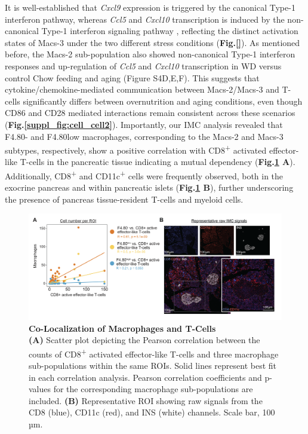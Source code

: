 It is well-established that \textit{Cxcl9} expression is triggered by the canonical Type-1 interferon pathway, whereas \textit{Ccl5} and \textit{Cxcl10} transcription is induced by the non-canonical Type-1 interferon signaling pathway \textbf{\cite{REF}}, reflecting the distinct activation states of Macs-3 under the two different stress conditions (\textbf{Fig.\ref{}}). As mentioned before, the Macs-2 sub-population also showed non-canonical Type-1 interferon responses and up-regulation of \textit{Ccl5} and \textit{Cxcl10} transcription in WD versus control Chow feeding and aging (Figure S4D,E,F). This suggests that cytokine/chemokine-mediated communication between Macs-2/Macs-3 and T-cells significantly differs between overnutrition and aging conditions, even though CD86 and CD28 mediated interactions remain consistent across these scenarios (\textbf{Fig.\ref{suppl_fig:cell_cell2}}). Importantly, our IMC analysis revealed that F4.80- and F4.80low macrophages, corresponding to the Macs-2 and Macs-3 subtypes, respectively, show a positive correlation with CD8\textsuperscript{+} activated effector-like T-cells in the pancreatic tissue indicating a mutual dependency (\textbf{Fig.\ref{fig2-8} A}). Additionally, CD8\textsuperscript{+} and CD11c\textsuperscript{+} cells were frequently observed, both in the exocrine pancreas and within pancreatic islets (\textbf{Fig.\ref{fig2-8} B}), further underscoring the presence of pancreas tissue-resident T-cells and myeloid cells.  


\begin{figure}[H]
\centering
\includegraphics[width=\linewidth]{Chapter4/Fig/F2-8-01.png}
\caption[res-cci-imc]{\textbf{Co-Localization of Macrophages and T-Cells}\\
\textbf{(A)} Scatter plot depicting the Pearson correlation between the counts of CD8\textsuperscript{+} activated effector-like T-cells and three macrophage sub-populations within the same ROIs. Solid lines represent best fit in each correlation analysis. Pearson correlation coefficients and p-values for the corresponding macrophage sub-populations are included. \textbf{(B)} Representative ROI showing raw signals from the CD8 (blue), CD11c (red), and INS (white) channels. Scale bar, 100 µm.}
\label{fig2-8}
\end{figure}

